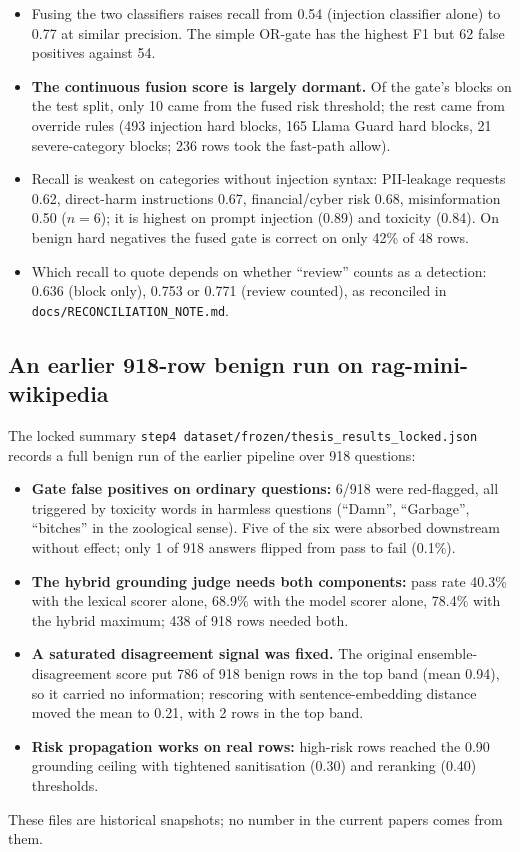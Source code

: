\documentclass[11pt,a4paper]{article}
\begin{document}
\begin{itemize}
\item Fusing the two classifiers raises recall from 0.54 (injection classifier alone) to 0.77 at similar precision.
  The simple OR-gate has the highest F1 but 62 false positives against 54.
\item \textbf{The continuous fusion score is largely dormant.} Of the gate's blocks on the test split, only 10 came from
  the fused risk threshold; the rest came from override rules (493 injection hard blocks, 165 Llama Guard hard
  blocks, 21 severe-category blocks; 236 rows took the fast-path allow).
\item Recall is weakest on categories without injection syntax: PII-leakage requests 0.62, direct-harm instructions
  0.67, financial/cyber risk 0.68, misinformation 0.50 ($n=6$); it is highest on prompt injection (0.89) and toxicity
  (0.84). On benign hard negatives the fused gate is correct on only 42\% of 48 rows.
\item Which recall to quote depends on whether ``review'' counts as a detection: 0.636 (block only), 0.753 or 0.771
  (review counted), as reconciled in \texttt{docs/RECONCILIATION\_NOTE.md}.
\end{itemize}

\subsection{An earlier 918-row benign run on rag-mini-wikipedia}

The locked summary \texttt{step4 dataset/frozen/thesis\_results\_locked.json} records a full benign run of the earlier
pipeline over 918 questions:
\begin{itemize}
\item \textbf{Gate false positives on ordinary questions:} 6/918 were red-flagged, all triggered by toxicity words in
  harmless questions (``Damn'', ``Garbage'', ``bitches'' in the zoological sense). Five of the six were absorbed
  downstream without effect; only 1 of 918 answers flipped from pass to fail (0.1\%).
\item \textbf{The hybrid grounding judge needs both components:} pass rate 40.3\% with the lexical scorer alone, 68.9\%
  with the model scorer alone, 78.4\% with the hybrid maximum; 438 of 918 rows needed both.
\item \textbf{A saturated disagreement signal was fixed.} The original ensemble-disagreement score put 786 of 918 benign
  rows in the top band (mean 0.94), so it carried no information; rescoring with sentence-embedding distance moved the
  mean to 0.21, with 2 rows in the top band.
\item \textbf{Risk propagation works on real rows:} high-risk rows reached the 0.90 grounding ceiling with tightened
  sanitisation (0.30) and reranking (0.40) thresholds.
\end{itemize}
These files are historical snapshots; no number in the current papers comes from them.
\end{document}
